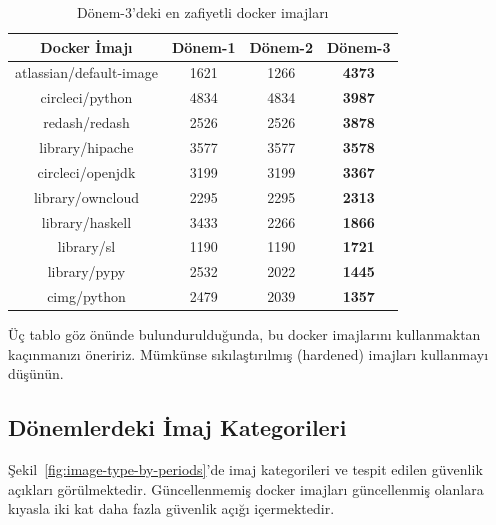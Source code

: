 \begin{table}
    \caption{Dönem-3'deki en zafiyetli docker imajları}\label{tab:most-vuln-images-p3}
    \centering
    \begin{tabular}{ |c|c|c|>{\bfseries}c| }
        \hline
        Docker İmajı & Dönem-1 & Dönem-2 & Dönem-3 \\
        \hline
        atlassian/default-image & 1621 & 1266 & 4373 \\
        circleci/python         & 4834 & 4834 & 3987 \\
        redash/redash           & 2526 & 2526 & 3878 \\
        library/hipache         & 3577 & 3577 & 3578 \\
        circleci/openjdk        & 3199 & 3199 & 3367 \\
        library/owncloud        & 2295 & 2295 & 2313 \\
        library/haskell         & 3433 & 2266 & 1866 \\
        library/sl              & 1190 & 1190 & 1721 \\
        library/pypy            & 2532 & 2022 & 1445 \\
        cimg/python             & 2479 & 2039 & 1357 \\
        \hline
    \end{tabular}
\end{table}

Üç tablo göz önünde bulundurulduğunda, bu docker imajlarını kullanmaktan kaçınmanızı öneririz. Mümkünse sıkılaştırılmış (hardened) imajları kullanmayı düşünün.

\subsection{Dönemlerdeki İmaj Kategorileri}\label{subsec:image-categories-in-periods}

Şekil~\ref{fig:image-type-by-periods}'de imaj kategorileri ve tespit edilen güvenlik açıkları görülmektedir. Güncellenmemiş docker imajları güncellenmiş olanlara kıyasla iki kat daha fazla güvenlik açığı içermektedir.

